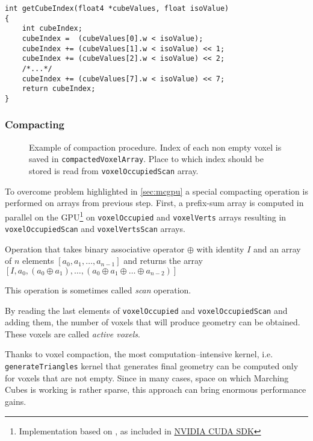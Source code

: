 \begin{lstlisting}
int getCubeIndex(float4 *cubeValues, float isoValue)
{
	int cubeIndex;
	cubeIndex =  (cubeValues[0].w < isoValue);
	cubeIndex += (cubeValues[1].w < isoValue) << 1;
	cubeIndex += (cubeValues[2].w < isoValue) << 2;
	/*...*/
	cubeIndex += (cubeValues[7].w < isoValue) << 7;
	return cubeIndex;
}
\end{lstlisting}

\subsubsection{Compacting}

\begin{figure}[b]
	\begin{center}
		
	\end{center}
	\caption{Example of compaction procedure. Index of each non empty voxel
		is saved in \texttt{compactedVoxelArray}. Place to which index
		should be stored is read from \texttt{voxelOccupiedScan} array.
	}
	\label{fig:mccompact}
\end{figure}

To overcome problem highlighted in \autoref{sec:mcgpu} a special compacting
operation is performed on arrays from previous step. First, a prefix-sum array
is computed in parallel on the GPU\footnote{Implementation based on \cite{gpugemsscan},
as included in \href{https://developer.nvidia.com/cuda-downloads}{NVIDIA CUDA SDK}}
on \texttt{voxelOccupied} and \texttt{voxelVerts} arrays resulting in
\texttt{voxelOccupiedScan} and \texttt{voxelVertsScan} arrays.

\begin{defn}
Operation that takes binary associative operator $\oplus$ with identity $I$ and
an array of $n$ elements $[a_0,a_1,\ldots,a_{n-1}]$ and returns the array
$[I,a_0,(a_0\oplus a_1),\ldots,(a_0\oplus a_1 \oplus \ldots \oplus a_{n-2})]$

This operation is sometimes called \emph{scan} operation.
\end{defn}

By reading the last elements of \texttt{voxelOccupied} and
\texttt{voxelOccupiedScan} and adding them, the number of voxels that will
produce geometry can be obtained. These voxels are called \emph{active voxels}.

Thanks to voxel compaction, the most computation--intensive kernel, i.e.
\texttt{generateTriangles} kernel that generates final geometry can be computed
only for voxels that are not empty. Since in many cases, space on which Marching
Cubes is working is rather sparse, this approach can bring enormous performance
gains.

